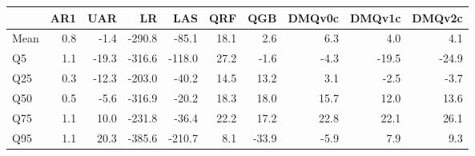 \begin{tabular}{lrrrrrrrrr}
\toprule
 & AR1 & UAR & LR & LAS & QRF & QGB & DMQv0c & DMQv1c & DMQv2c \\
\midrule
Mean & 0.8 & -1.4 & -290.8 & -85.1 & 18.1 & 2.6 & 6.3 & 4.0 & 4.1 \\
Q5 & 1.1 & -19.3 & -316.6 & -118.0 & 27.2 & -1.6 & -4.3 & -19.5 & -24.9 \\
Q25 & 0.3 & -12.3 & -203.0 & -40.2 & 14.5 & 13.2 & 3.1 & -2.5 & -3.7 \\
Q50 & 0.5 & -5.6 & -316.9 & -20.2 & 18.3 & 18.0 & 15.7 & 12.0 & 13.6 \\
Q75 & 1.1 & 10.0 & -231.8 & -36.4 & 22.2 & 17.2 & 22.8 & 22.1 & 26.1 \\
Q95 & 1.1 & 20.3 & -385.6 & -210.7 & 8.1 & -33.9 & -5.9 & 7.9 & 9.3 \\
\bottomrule
\end{tabular}
